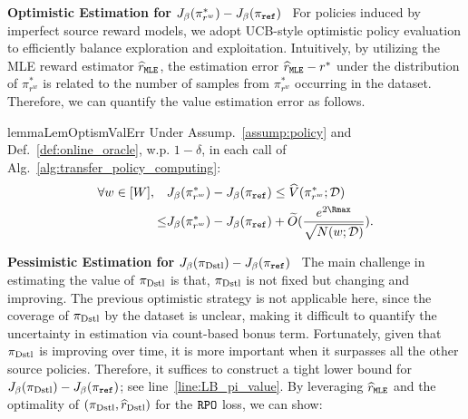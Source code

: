 \textbf{Optimistic Estimation for} $J_\beta(\pi^*_{r^w}) - J_\beta(\pi_{\texttt{ref}})$~
For policies induced by imperfect source reward models, we adopt UCB-style optimistic policy evaluation to efficiently balance exploration and exploitation.
Intuitively, by utilizing the MLE reward estimator ${\widehat{r}}_{\texttt{MLE}}$, the estimation error ${\widehat{r}}_{\texttt{MLE}} - r^*$ under the distribution of $\pi^*_{r^w}$ is related to the number of samples from $\pi^*_{r^w}$ occurring in the dataset. Therefore, we can quantify the value estimation error as follows.
%
\begin{restatable}{lemma}{LemOptismValErr}\label{lem:formal_optism_val_est_error}
    Under Assump.~\ref{assump:policy} and Def.~\ref{def:online_oracle}, w.p. $1-\delta$, in each call of Alg.~\ref{alg:transfer_policy_computing}:
    \begin{align*}
        \forall w\in[W],\quad & J_\beta(\pi^*_{r^w}) - J_\beta(\pi_\textref) \leq \hat{V}(\pi^*_{r^w};\cD) \\
        \leq & J_\beta(\pi^*_{r^w}) - J_\beta(\pi_\textref) + \tilde{O}(\frac{e^{2{\Rmax}}}{\sqrt{N(w;\cD)}}).
    \end{align*}
\end{restatable}

%
%
%
\textbf{Pessimistic Estimation for} $J_\beta(\pi_{\text{Dstl}})-J_\beta(\pi_{\texttt{ref}})$~
The main challenge in estimating the value of $\pi_{\text{Dstl}}$ is that, $\pi_{\text{Dstl}}$ is not fixed but changing and improving.
The previous optimistic strategy is not applicable here, since the coverage of $\pi_{\text{Dstl}}$ by the dataset is unclear, making it difficult to quantify the uncertainty in estimation via count-based bonus term.
Fortunately, given that $\pi_{\text{Dstl}}$ is improving over time, it is more important when it surpasses all the other source policies. Therefore, it suffices to construct a tight lower bound for $J_\beta(\pi_{\text{Dstl}})-J_\beta(\pi_{\texttt{ref}})$; see line~\ref{line:LB_pi_value}. 
By leveraging $\widehat{r}_{\texttt{MLE}}$ and the optimality of $(\pi_{\text{Dstl}}, {\widehat{r}}_{\text{Dstl}})$ for the ${\texttt{RPO}}$ loss, we can show:
%
%
%
%
%
%
%
%
%

%
%
%

